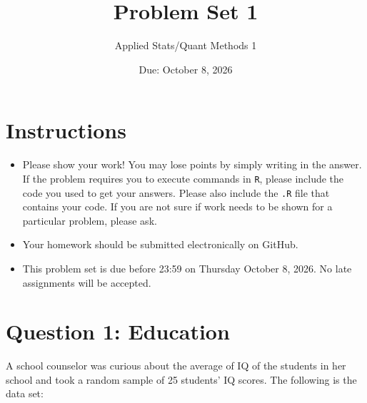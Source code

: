 \documentclass[12pt,letterpaper]{article}
\title{Problem Set 1}
\date{Due: October 8, 2026}
\author{Applied Stats/Quant Methods 1}
\begin{document}
	\maketitle
	
	\section*{Instructions}
	\begin{itemize}
	\item Please show your work! You may lose points by simply writing in the answer. If the problem requires you to execute commands in \texttt{R}, please include the code you used to get your answers. Please also include the \texttt{.R} file that contains your code. If you are not sure if work needs to be shown for a particular problem, please ask.
\item Your homework should be submitted electronically on GitHub.
\item This problem set is due before 23:59 on Thursday October 8, 2026. No late assignments will be accepted.
	\end{itemize}
	
	\vspace{1cm}
	\section*{Question 1: Education}

A school counselor was curious about the average of IQ of the students in her school and took a random sample of 25 students' IQ scores. The following is the data set:\\
\vspace{.5cm}

  

\vspace{1cm}
\end{document}
